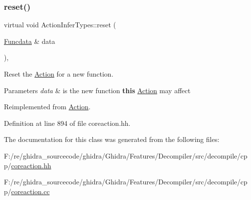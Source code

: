 \subsubsection{\texorpdfstring{reset()}{reset()}}
{\footnotesize\ttfamily virtual void Action\+Infer\+Types\+::reset (\begin{DoxyParamCaption}\item[{\mbox{\hyperlink{class_funcdata}{Funcdata}} \&}]{data }\end{DoxyParamCaption})\hspace{0.3cm}{\ttfamily [inline]}, {\ttfamily [virtual]}}



Reset the \mbox{\hyperlink{class_action}{Action}} for a new function. 


\begin{DoxyParams}{Parameters}
{\em data} & is the new function {\bfseries{this}} \mbox{\hyperlink{class_action}{Action}} may affect \\
\hline
\end{DoxyParams}


Reimplemented from \mbox{\hyperlink{class_action_ac7c1cf16bb63e0741ba16be5179cf943}{Action}}.



Definition at line 894 of file coreaction.\+hh.



The documentation for this class was generated from the following files\+:\begin{DoxyCompactItemize}
\item 
F\+:/re/ghidra\+\_\+sourcecode/ghidra/\+Ghidra/\+Features/\+Decompiler/src/decompile/cpp/\mbox{\hyperlink{coreaction_8hh}{coreaction.\+hh}}\item 
F\+:/re/ghidra\+\_\+sourcecode/ghidra/\+Ghidra/\+Features/\+Decompiler/src/decompile/cpp/\mbox{\hyperlink{coreaction_8cc}{coreaction.\+cc}}\end{DoxyCompactItemize}
